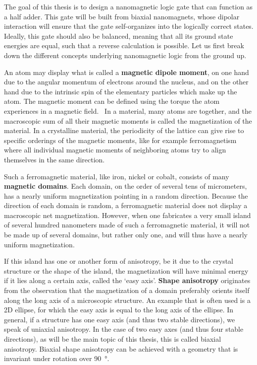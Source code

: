 \documentclass[11pt,a4paper,english]{article}
\begin{document}
\noindent The goal of this thesis is to design a nanomagnetic logic gate that can function as a half adder. This gate will be built from biaxial nanomagnets, whose dipolar interaction will ensure that the gate self-organizes into the logically correct states. Ideally, this gate should also be balanced, meaning that all its ground state energies are equal, such that a reverse calculation is possible. Let us first break down the different concepts underlying nanomagnetic logic from the ground up. \par %
An atom may display what is called a \textbf{magnetic dipole moment}, on one hand due to the angular momentum of electrons around the nucleus, and on the other hand due to the intrinsic spin of the elementary particles which make up the atom. The magnetic moment can be defined using the torque the atom experiences in a magnetic field.~\cite{IntroMagneticMaterials} In a material, many atoms are together, and the macroscopic sum of all their magnetic moments is called the magnetization of the material. In a crystalline material, the periodicity of the lattice can give rise to specific orderings of the magnetic moments, like for example ferromagnetism where all individual magnetic moments of neighboring atoms try to align themselves in the same direction. \par 
Such a ferromagnetic material, like iron, nickel or cobalt, consists of many \textbf{magnetic domains}. Each domain, on the order of several tens of micrometers, has a nearly uniform magnetization pointing in a random direction. Because the direction of each domain is random, a ferromagnetic material does not display a macroscopic net magnetization. However, when one fabricates a very small island of several hundred nanometers made of such a ferromagnetic material, it will not be made up of several domains, but rather only one, and will thus have a nearly uniform magnetization. \par
If this island has one or another form of anisotropy, be it due to the crystal structure or the shape of the island, the magnetization will have minimal energy if it lies along a certain axis, called the `easy axis'. \textbf{Shape anisotropy} originates from the observation that the magnetization of a domain preferably orients itself along the long axis of a microscopic structure. An example that is often used is a 2D ellipse, for which the easy axis is equal to the long axis of the ellipse. In general, if a structure has one easy axis (and thus two stable directions), we speak of uniaxial anisotropy. In the case of two easy axes (and thus four stable directions), as will be the main topic of this thesis, this is called biaxial anisotropy. Biaxial shape anisotropy can be achieved with a geometry that is invariant under rotation over \SI{90}{\degree}. \par
\end{document}
